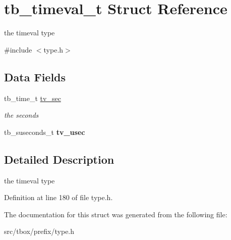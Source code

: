 \hypertarget{structtb__timeval__t}{\section{tb\-\_\-timeval\-\_\-t Struct Reference}
\label{structtb__timeval__t}
}


the timeval type  




{\ttfamily \#include $<$type.\-h$>$}

\subsection*{Data Fields}
\begin{DoxyCompactItemize}
\item 
\hypertarget{structtb__timeval__t_ac5ff3751cd0fba802fb786130a54f57c}{tb\-\_\-time\-\_\-t \hyperlink{structtb__timeval__t_ac5ff3751cd0fba802fb786130a54f57c}{tv\-\_\-sec}}\label{structtb__timeval__t_ac5ff3751cd0fba802fb786130a54f57c}

\begin{DoxyCompactList}\small\item\em the seconds \end{DoxyCompactList}\item 
\hypertarget{structtb__timeval__t_abb047cd7b524ac3c663fedd8a8638795}{tb\-\_\-suseconds\-\_\-t {\bfseries tv\-\_\-usec}}\label{structtb__timeval__t_abb047cd7b524ac3c663fedd8a8638795}

\end{DoxyCompactItemize}


\subsection{Detailed Description}
the timeval type 

Definition at line 180 of file type.\-h.



The documentation for this struct was generated from the following file\-:\begin{DoxyCompactItemize}
\item 
src/tbox/prefix/type.\-h\end{DoxyCompactItemize}
